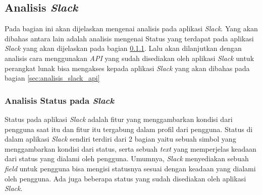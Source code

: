 \subsection{Analisis \textit{Slack}}
\label{sec:analisis_slack}
Pada bagian ini akan dijelaskan mengenai analisis pada aplikasi \textit{Slack}. Yang akan dibahas antara lain adalah analisis mengenai Status yang terdapat pada aplikasi \textit{Slack} yang akan dijelaskan pada bagian \ref{sec:analisis_status}. Lalu akan dilanjutkan dengan analisis cara menggunakan \textit{API} yang sudah disediakan oleh aplikasi \textit{Slack} untuk perangkat lunak bisa mengakses kepada aplikasi \textit{Slack} yang akan dibahas pada bagian \ref{sec:analisis_slack_api}

\subsubsection{Analisis Status pada \textit{Slack}}
\label{sec:analisis_status}
Status pada aplikasi \textit{Slack} adalah fitur yang menggambarkan kondisi dari pengguna saat itu dan fitur itu tergabung dalam profil dari pengguna. Status di dalam aplikasi \textit{Slack} sendiri terdiri dari 2 bagian yaitu sebuah simbol yang menggambarkan kondisi dari status, serta sebuah \textit{text} yang memperjelas keadaan dari status yang dialami oleh pengguna. Umumnya, \textit{Slack} menyediakan sebuah \textit{field} untuk pengguna bisa mengisi statusnya sesuai dengan keadaan yang dialami oleh pengguna. Ada juga beberapa status yang sudah disediakan oleh aplikasi \textit{Slack}. 


